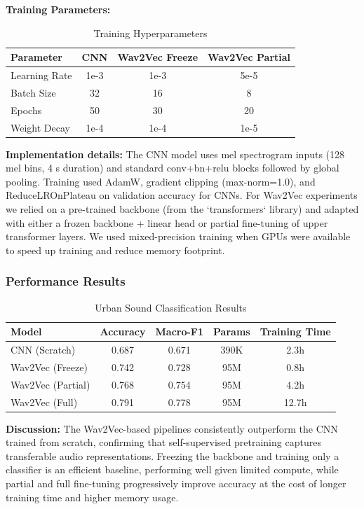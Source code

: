 \documentclass[conference]{IEEEtran}
\begin{document}
\textbf{Training Parameters:}
\begin{table}[H]
\centering
\caption{Training Hyperparameters}
\begin{tabular}{l c c c}
\toprule
Parameter & CNN & Wav2Vec Freeze & Wav2Vec Partial \\
\midrule
Learning Rate & 1e-3 & 1e-3 & 5e-5 \\
Batch Size & 32 & 16 & 8 \\
Epochs & 50 & 30 & 20 \\
Weight Decay & 1e-4 & 1e-4 & 1e-5 \\
\midrule
\end{tabular}
\label{tab:training_params}
\end{table}

\textbf{Implementation details:} The CNN model uses mel spectrogram inputs (128 mel bins, 4 s duration) and standard conv+bn+relu blocks followed by global pooling. Training used AdamW, gradient clipping (max-norm=1.0), and ReduceLROnPlateau on validation accuracy for CNNs. For Wav2Vec experiments we relied on a pre-trained backbone (from the `transformers` library) and adapted with either a frozen backbone + linear head or partial fine-tuning of upper transformer layers. We used mixed-precision training when GPUs were available to speed up training and reduce memory footprint.

\subsubsection{Performance Results}
\label{sec:q2_results}

\begin{table}[H]
\centering
\caption{Urban Sound Classification Results}
\begin{tabular}{l c c c c}
\toprule
Model & Accuracy & Macro-F1 & Params & Training Time \\
\midrule
CNN (Scratch) & 0.687 & 0.671 & 390K & 2.3h \\
Wav2Vec (Freeze) & 0.742 & 0.728 & 95M & 0.8h \\
Wav2Vec (Partial) & 0.768 & 0.754 & 95M & 4.2h \\
Wav2Vec (Full) & 0.791 & 0.778 & 95M & 12.7h \\
\midrule
\end{tabular}
\label{tab:urban_results}
\end{table}

\textbf{Discussion:} The Wav2Vec-based pipelines consistently outperform the CNN trained from scratch, confirming that self-supervised pretraining captures transferable audio representations. Freezing the backbone and training only a classifier is an efficient baseline, performing well given limited compute, while partial and full fine-tuning progressively improve accuracy at the cost of longer training time and higher memory usage.
\end{document}
